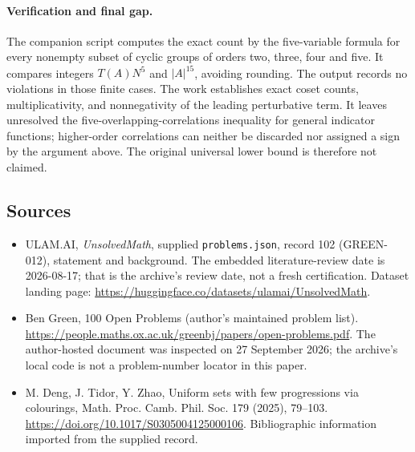 \documentclass[11pt,a4paper]{article}
\begin{document}
\paragraph{Verification and final gap.}
The companion script computes the exact count by the five-variable formula for every nonempty subset of cyclic groups of orders two, three, four and five. It compares integers $T(A)N^5$ and $|A|^{15}$, avoiding rounding. The output records no violations in those finite cases. The work establishes exact coset counts, multiplicativity, and nonnegativity of the leading perturbative term. It leaves unresolved the five-overlapping-correlations inequality for general indicator functions; higher-order correlations can neither be discarded nor assigned a sign by the argument above. The original universal lower bound is therefore not claimed.

\subsection{Sources}

{\small

\begin{itemize}

\item[\hypertarget{source:102:1}{S1}] ULAM.AI, \emph{UnsolvedMath}, supplied \texttt{problems.json}, record 102 (GREEN-012), statement and background. The embedded literature-review date is 2026-08-17; that is the archive’s review date, not a fresh certification. Dataset landing page: \url{https://huggingface.co/datasets/ulamai/UnsolvedMath}.

\item[\hypertarget{source:102:2}{S2}] Ben Green, 100 Open Problems (author’s maintained problem list). \url{https://people.maths.ox.ac.uk/greenbj/papers/open-problems.pdf}. The author-hosted document was inspected on 27 September 2026; the archive’s local code is not a problem-number locator in this paper.

\item[\hypertarget{source:102:3}{S3}] M. Deng, J. Tidor, Y. Zhao, Uniform sets with few progressions via colourings, Math. Proc. Camb. Phil. Soc. 179 (2025), 79--103. \url{https://doi.org/10.1017/S0305004125000106}. Bibliographic information imported from the supplied record.

\end{itemize}

}

\label{end:102}
\end{document}
